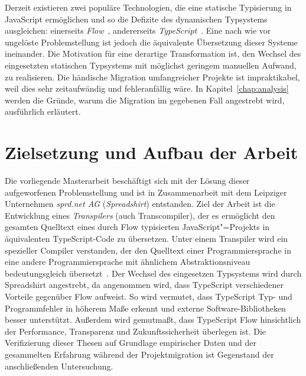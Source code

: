 Derzeit existieren zwei populäre Technologien, die eine statische Typisierung in JavaScript ermöglichen und so die Defizite des dynamischen Typsystems ausgleichen: einerseits \textit{Flow}~\autocite{FLOW:PAPER}, andererseits \textit{TypeScript}~\autocite{TYPESCRIPT:SPEC}. Eine nach wie vor ungelöste Problemstellung ist jedoch die äquivalente Übersetzung dieser Systeme ineinander. Die Motivation für eine derartige Transformation ist, den Wechsel des eingesetzten statischen Typsystems mit möglichst geringem manuellen Aufwand, zu realisieren. Die händische Migration umfangreicher Projekte ist impraktikabel, weil dies sehr zeitaufwändig und fehleranfällig wäre. In Kapitel~\ref{chap:analysis} werden die Gründe, warum die Migration im gegebenen Fall angestrebt wird, ausführlich erläutert.

\section{Zielsetzung und Aufbau der Arbeit}

Die vorliegende Masterarbeit beschäftigt sich mit der Lösung dieser aufgeworfenen Problemstellung und ist in Zusammenarbeit mit dem Leipziger Unternehmen \textit{sprd.net AG} (\textit{Spreadshirt}) entstanden. Ziel der Arbeit ist die Entwicklung eines \emph{Transpilers} (auch Transcompiler), der es ermöglicht den gesamten Quelltext eines durch Flow typisierten JavaScript"=Projekts in äquivalenten TypeScript-Code zu übersetzen. Unter einem Transpiler wird ein spezieller Compiler verstanden, der den Quelltext einer Programmiersprache in eine andere Programmiersprache mit ähnlichem Abstraktionsniveau bedeutungsgleich übersetzt~\autocite{EVGENIY:2016}. Der Wechsel des eingesetzen Typsystems wird durch Spreadshirt angestrebt, da angenommen wird, dass TypeScript verschiedener Vorteile gegenüber Flow aufweist. So wird vermutet, dass TypeScript Typ- und Programmfehler in höherem Maße erkennt und externe Software-Bibliotheken besser unterstützt. Außerdem wird gemutmaßt, dass TypeScript Flow hinsichtlich der Performance, Transparenz und Zukunftssicherheit überlegen ist. Die Verifizierung dieser Thesen auf Grundlage empirischer Daten und der gesammelten Erfahrung während der Projektmigration ist Gegenstand der anschließenden Untersuchung.

